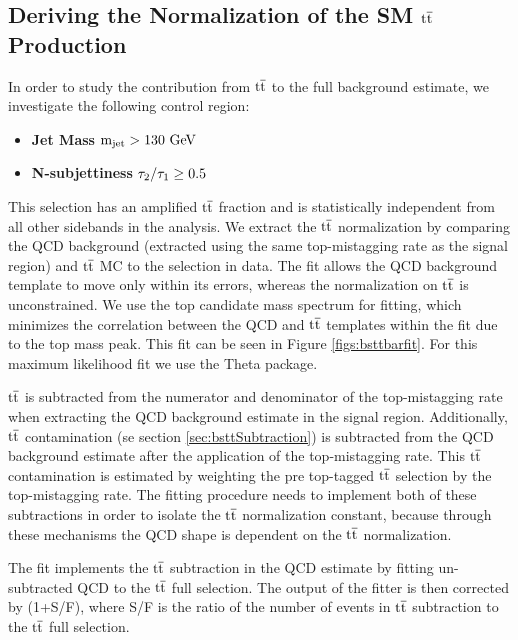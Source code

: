 \subsection{Deriving the Normalization of the SM $\mathrm{t\overline{t}}$ Production}
\label{sec:bsttbarsideband}
In order to study the contribution from $\mathrm{t\overline{t}}$ to the full background estimate, 
we investigate the following control region:
\begin{itemize}
\item {\bf Jet Mass}   $\mathrm{m_{\text{jet}} > 130~\mathrm{GeV}}$ 
\item {\bf N-subjettiness} $\mathrm{\boldmath \tau_2/\tau_1 \geq 0.5}$ 
\end{itemize}
This selection has an amplified $\mathrm{t\overline{t}}$ fraction and is statistically independent from all other sidebands in the analysis.    
We extract the $\mathrm{t\overline{t}}$ normalization by comparing the QCD background (extracted using the same top-mistagging rate as the signal region) and $\mathrm{t\overline{t}}$ MC to the selection in data.
The fit allows the QCD background template to move only within its errors, whereas the normalization on $\mathrm{t\overline{t}}$ is unconstrained. 
We use the top candidate mass spectrum for fitting, which minimizes the correlation between the 
QCD and $\mathrm{t\overline{t}}$ templates within the fit due to the top mass peak. This fit can be seen in Figure \ref{figs:bsttbarfit}.  For this maximum likelihood fit we use the Theta package.

$\mathrm{t\overline{t}}$ is subtracted from the numerator and denominator of the top-mistagging rate when extracting the QCD background estimate in the signal region.  
Additionally, $\mathrm{t\overline{t}}$ contamination (se section \ref{sec:bsttSubtraction}) is subtracted from the QCD background estimate after the application of the top-mistagging rate.  
This $\mathrm{t\overline{t}}$ contamination is estimated by weighting the pre top-tagged $\mathrm{t\overline{t}}$ selection by the top-mistagging rate.  The fitting procedure needs to implement both of these subtractions 
in order to isolate the $\mathrm{t\overline{t}}$ normalization constant, because through these mechanisms the QCD shape is dependent on the $\mathrm{t\overline{t}}$ normalization.

The fit implements the $\mathrm{t\overline{t}}$ subtraction in the QCD estimate by fitting un-subtracted QCD to the $\mathrm{t\overline{t}}$ full selection.  
The output of the fitter is then corrected by  
(1+S/F), where S/F is the ratio of the number of events in $\mathrm{t\overline{t}}$ subtraction to the $\mathrm{t\overline{t}}$ full selection. 

